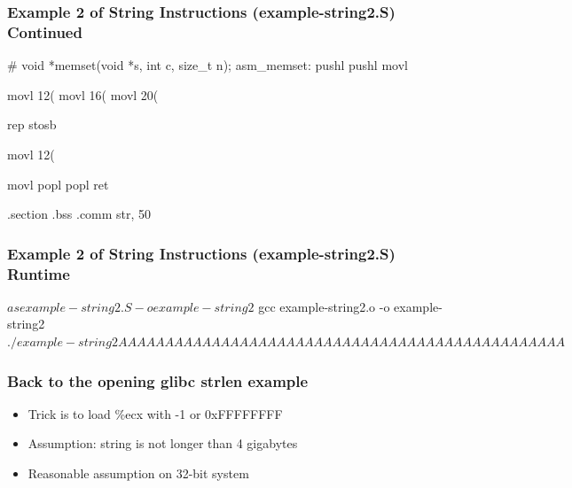 \documentclass[11pt,xcolor=dvipsnames]{beamer}
\newcommand{\mvs}{\vspace{-0.95em}}
\begin{document}
\begin{frame}[fragile,t]
\mvs
\frametitle{Example 2 of String Instructions (example-string2.S) Continued}
\begin{gascode}
# void *memset(void *s, int c, size_t n);
asm_memset:
  pushl %
  pushl %
  movl %

  movl 12(%
  movl 16(%
  movl 20(%

  rep stosb

  movl 12(%

  movl %
  popl %
  popl %
  ret

.section .bss
  .comm str, 50
\end{gascode}
\end{frame}

\begin{frame}[fragile,t]
\mvs
\frametitle{Example 2 of String Instructions (example-string2.S) Runtime}
\begin{textcode}
$ as example-string2.S -o example-string2
$ gcc example-string2.o -o example-string2
$ ./example-string2
AAAAAAAAAAAAAAAAAAAAAAAAAAAAAAAAAAAAAAAAAAAAAAAA
$
\end{textcode}
\end{frame}

\begin{frame}[fragile,t]
\mvs
\frametitle{Back to the opening glibc strlen example}
\begin{itemize}
  \item Trick is to load {\ttfamily \%ecx} with -1 or {\ttfamily 0xFFFFFFFF}
  \item Assumption: string is not longer than 4 gigabytes
  \item Reasonable assumption on 32-bit system
\end{itemize}
\end{frame}
\end{document}
